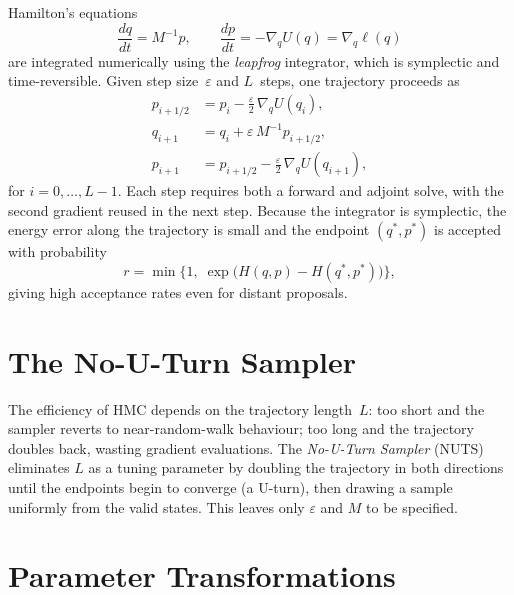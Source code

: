 Hamilton's equations
\begin{equation}
  \frac{dq}{dt} = M^{-1}p,
  \qquad
  \frac{dp}{dt} = -\nabla_q U(q) = \nabla_q \ell(q)
  \label{eq:hamiltons-equations}
\end{equation}
are integrated numerically using the \emph{leapfrog} integrator, which is
symplectic and time-reversible. Given step size~$\varepsilon$ and
$L$~steps, one trajectory proceeds as
\begin{equation}
  \begin{aligned}
    p_{i+1/2} &= p_i - \tfrac{\varepsilon}{2}\,\nabla_q U(q_i), \\
    q_{i+1}   &= q_i + \varepsilon\, M^{-1} p_{i+1/2}, \\
    p_{i+1}   &= p_{i+1/2}
    - \tfrac{\varepsilon}{2}\,\nabla_q U(q_{i+1}),
  \end{aligned}
  \label{eq:leapfrog}
\end{equation}
for $i = 0, \ldots, L-1$. Each step requires both a forward and
adjoint solve, with the second gradient reused in the next step.
Because the integrator is symplectic, the energy error
along the trajectory is small and the endpoint $(q^*, p^*)$ is accepted
with probability
\begin{equation}
  r = \min\!\big\{1,\;
  \exp\!\big(H(q, p) - H(q^*, p^*)\big)\big\},
  \label{eq:hmc-acceptance}
\end{equation}
giving high acceptance rates even for distant proposals.

\section{The No-U-Turn Sampler}\label{sec:nuts}

The efficiency of HMC depends on the trajectory length~$L$: too short
and the sampler reverts to near-random-walk behaviour; too long and the
trajectory doubles back, wasting gradient evaluations. The \emph{No-U-Turn
Sampler} (NUTS)~\cite{cabezas2024blackjax,hoffman2014no} eliminates
$L$ as a tuning parameter
by doubling the trajectory in both directions until the endpoints begin
to converge (a U-turn), then drawing a sample uniformly from the valid
states. This leaves only $\varepsilon$ and $M$ to be specified.

\section{Parameter Transformations}\label{sec:transformations}

